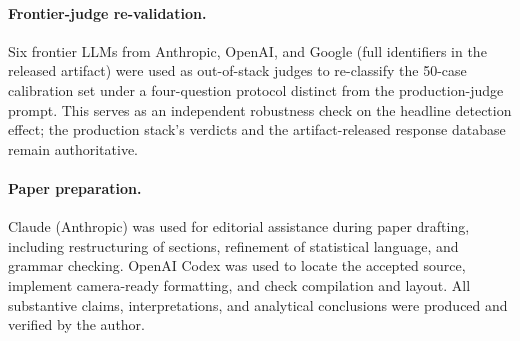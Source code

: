 \documentclass[sigconf]{acmart}
\begin{document}
\paragraph{Frontier-judge re-validation.}
Six frontier LLMs from Anthropic, OpenAI, and Google (full identifiers in
the released artifact) were used as out-of-stack judges to
re-classify the 50-case calibration set under a four-question protocol
distinct from the production-judge prompt. This serves as an independent
robustness check on the headline detection effect; the production stack's
verdicts and the artifact-released response database remain authoritative.

\paragraph{Paper preparation.}
Claude (Anthropic) was used for editorial assistance during paper
drafting, including restructuring of sections, refinement of statistical
language, and grammar checking. OpenAI Codex was used to locate the accepted
source, implement camera-ready formatting, and check compilation and layout.
All substantive claims, interpretations, and analytical conclusions were
produced and verified by the author.
\end{document}

